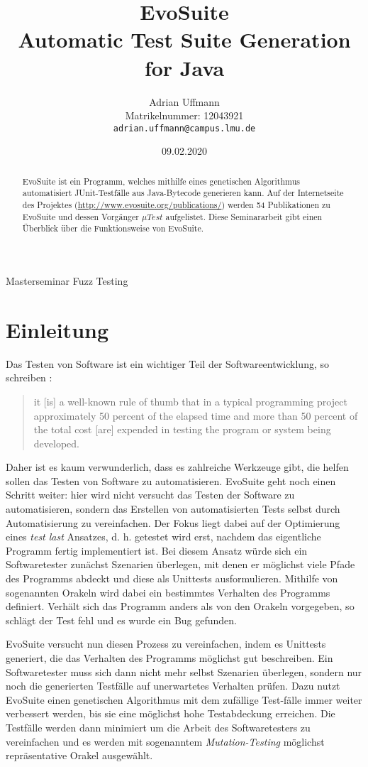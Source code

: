 \documentclass[a4paper,11pt]{article}
\title{\textbf{EvoSuite}\\
Automatic Test Suite Generation for Java}
\author{Adrian Uffmann\\
Matrikelnummer: 12043921\\
\texttt{adrian.uffmann@campus.lmu.de}}
\date{09.02.2020}
\begin{document}
\maketitle

\begin{center}
Masterseminar Fuzz Testing
\end{center}

\begin{abstract}
EvoSuite ist ein Programm, welches mithilfe eines genetischen Algorithmus automatisiert JUnit-Testfälle aus Java-Bytecode generieren kann.
Auf der Internetseite des Projektes (\url{http://www.evosuite.org/publications/}) werden 54 Publikationen zu EvoSuite und dessen Vorgänger ${\mu}Test$ aufgelistet.
Diese Seminararbeit gibt einen Überblick über die Funktionsweise von EvoSuite.
\end{abstract}

\section{Einleitung}

Das Testen von Software ist ein wichtiger Teil der Softwareentwicklung, so schreiben \citet{myers2004art}:
\begin{quote}
it [is] a well-known rule of thumb that in a typical programming project approximately 50 percent of the elapsed time and more than 50 percent of the total cost [are] expended in testing the program or system being developed.
\end{quote}
Daher ist es kaum verwunderlich, dass es zahlreiche Werkzeuge gibt, die helfen sollen das Testen von Software zu automatisieren.
EvoSuite geht noch einen Schritt weiter: hier wird nicht versucht das Testen der Software zu automatisieren, sondern das Erstellen von automatisierten Tests selbst durch Automatisierung zu vereinfachen.
Der Fokus liegt dabei auf der Optimierung eines \textit{test last} Ansatzes, d. h. getestet wird erst, nachdem das eigentliche Programm fertig implementiert ist.
Bei diesem Ansatz würde sich ein Softwaretester zunächst Szenarien überlegen, mit denen er möglichst viele Pfade des Programms abdeckt und diese als Unittests ausformulieren.
Mithilfe von sogenannten Orakeln wird dabei ein bestimmtes Verhalten des Programms definiert.
Verhält sich das Programm anders als von den Orakeln vorgegeben, so schlägt der Test fehl und es wurde ein Bug gefunden.

EvoSuite versucht nun diesen Prozess zu vereinfachen, indem es Unittests generiert, die das Verhalten des Programms möglichst gut beschreiben.
Ein Softwaretester muss sich dann nicht mehr selbst Szenarien überlegen, sondern nur noch die generierten Testfälle auf unerwartetes Verhalten prüfen.
Dazu nutzt EvoSuite einen genetischen Algorithmus mit dem zufällige Test-fälle immer weiter verbessert werden, bis sie eine möglichst hohe Testabdeckung erreichen.
Die Testfälle werden dann minimiert um die Arbeit des Softwaretesters zu vereinfachen und es werden mit sogenanntem \textit{Mutation-Testing} möglichst repräsentative Orakel ausgewählt.
\end{document}
